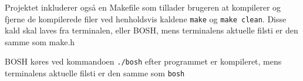 Projektet inkluderer også en Makefile som tillader brugeren at kompilerer og fjerne de kompilerede filer ved henholdsvis kaldene \verb+make+ og \verb+make clean+. Disse kald skal laves fra terminalen, eller BOSH, mens terminalens aktuelle filsti er den samme som make.h

BOSH køres ved kommandoen \verb+./bosh+ efter programmet er kompileret, mens terminalens aktuelle filsti er den samme som \verb+bosh+